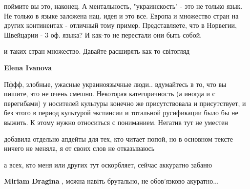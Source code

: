 \begin{itemize}
\begin{itemize}
поймите вы это, наконец. А ментальность, "украинскость" - это не только язык.
Не только в языке заложена нац. идея и это все. Европа и множество стран на
других континентах - отличный тому пример. Представляете, что в Норвегии,
Швейцарии - 3 оф. языка? И как-то не перестали они быть собой.

и таких стран множество. Давайте расширять как-то світогляд

 
\textbf{Elena Ivanova} 

Пффф, злобные, ужасные украиноязычные люди.. вдумайтесь в то, что вы пишите,
это не очень смешно. Некоторая категоричность (а иногда и с перегибами) у
носителей культуры конечно же присутствовала и присутствует, и без этого в
период культурой экспансии и тотальной русификации было бы не выжить. К этому
нужно относиться с пониманием. Негатив тут не уместен
\end{itemize}

 
добавила отдельно апдейты для тех, кто читает попой, но в основном тексте ничего не меняла, я от своих слов не отказываюсь

 
а всех, кто меня или других тут оскорбляет, сейчас аккуратно забаню

 
\textbf{Miriam Dragina} , можна навіть брутально, не обов’язково акуратно...

 

\end{itemize}
